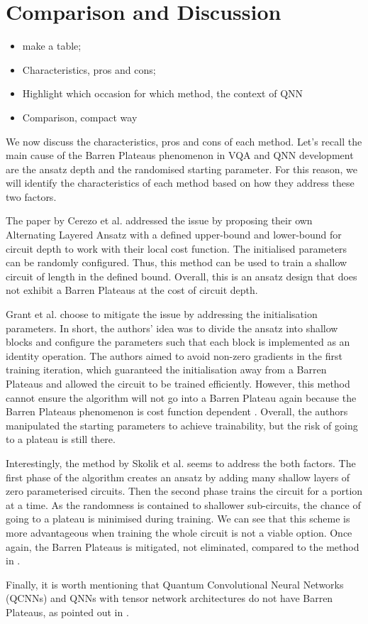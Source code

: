 \section{Comparison and Discussion}
\begin{itemize}
    \item make a table;
    \item Characteristics, pros and cons;
    \item Highlight which occasion for which method, the context of QNN
    \item Comparison, compact way
\end{itemize}

We now discuss the characteristics, pros and cons of each method.
Let's recall the main cause of the Barren Plateaus phenomenon in VQA and QNN development are the ansatz depth and the randomised starting parameter.
For this reason, we will identify the characteristics of each method based on how they address these two factors.

The paper \cite{cerezoCostFunctionDependent2021} by Cerezo et al. addressed the issue by proposing their own Alternating Layered Ansatz with a defined upper-bound and lower-bound for circuit depth to work with their local cost function. 
The initialised parameters can be randomly configured.
Thus, this method can be used to train a shallow circuit of length in the defined bound. 
Overall, this is an ansatz design that does not exhibit a Barren Plateaus at the cost of circuit depth.

Grant et al. \cite{grantInitializationStrategyAddressing2019} choose to mitigate the issue by addressing the initialisation parameters. 
In short, the authors' idea was to divide the ansatz into shallow blocks and configure the parameters such that each block is implemented as an identity operation.
The authors aimed to avoid non-zero gradients in the first training iteration, which guaranteed the initialisation away from a Barren Plateaus and allowed the circuit to be trained efficiently.
However, this method cannot ensure the algorithm will not go into a Barren Plateau again because the Barren Plateaus phenomenon is cost function dependent \cite{cerezoCostFunctionDependent2021}.
Overall, the authors manipulated the starting parameters to achieve trainability, but the risk of going to a plateau is still there.

Interestingly, the method by Skolik et al. \cite{skolikLayerwiseLearningQuantum2021} seems to address the both factors.
The first phase of the algorithm creates an ansatz by adding many shallow layers of zero parameterised circuits. 
Then the second phase trains the circuit for a portion at a time.
As the randomness is contained to shallower sub-circuits, the chance of going to a plateau is minimised during training.
We can see that this scheme is more advantageous when training the whole circuit is not a viable option. 
Once again, the Barren Plateaus is mitigated, not eliminated, compared to the method in \cite{cerezoCostFunctionDependent2021}.

Finally, it is worth mentioning that Quantum Convolutional Neural Networks (QCNNs) and QNNs with tensor network architectures do not have Barren Plateaus, as pointed out in \cite{congQuantumConvolutionalNeural2019}.